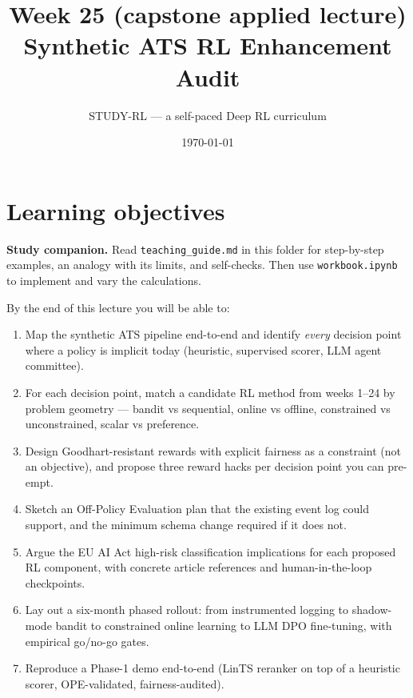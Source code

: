 \documentclass[11pt,oneside]{scrbook}
\title{{\color{rlblue}\textbf{Week 25 (capstone applied lecture)} \\ \Huge Synthetic ATS RL Enhancement Audit}}
\author{STUDY-RL --- a self-paced Deep RL curriculum}
\date{\today}
\begin{document}
\maketitle
\tableofcontents
\newpage

\chapter*{Learning objectives}


\noindent\textbf{Study companion.} Read \texttt{teaching\_guide.md} in this
folder for step-by-step examples, an analogy with its limits, and self-checks.
Then use \texttt{workbook.ipynb} to implement and vary the calculations.
\par\medskip

\begin{keyidea}
By the end of this lecture you will be able to:
\begin{enumerate}\setlength\itemsep{2pt}
  \item Map the synthetic ATS pipeline end-to-end and identify
        \emph{every} decision point where a policy is implicit today
        (heuristic, supervised scorer, LLM agent committee).
  \item For each decision point, match a candidate RL method from
        weeks 1--24 by problem geometry --- bandit vs sequential, online
        vs offline, constrained vs unconstrained, scalar vs preference.
  \item Design Goodhart-resistant rewards with explicit fairness as a
        constraint (not an objective), and propose three reward hacks
        per decision point you can pre-empt.
  \item Sketch an Off-Policy Evaluation plan that the existing event log
        could support, and the minimum schema change required if it does not.
  \item Argue the EU AI Act high-risk classification implications for
        each proposed RL component, with concrete article references and
        human-in-the-loop checkpoints.
  \item Lay out a six-month phased rollout: from instrumented logging
        to shadow-mode bandit to constrained online learning to LLM DPO
        fine-tuning, with empirical go/no-go gates.
  \item Reproduce a Phase-1 demo end-to-end (LinTS reranker on top of a
        heuristic scorer, OPE-validated, fairness-audited).
\end{enumerate}
\end{keyidea}
\end{document}
